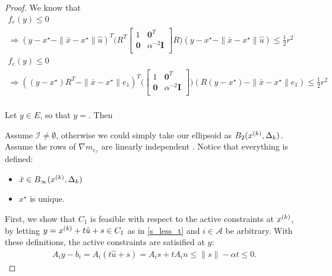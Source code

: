 \begin{proof}
\vspace{10cm}








We know that
\begin{align*}
f_e(y) \le 0 \\
\Longrightarrow (y - x^{\star} - \|\bar x - x^{\star} \|\hat u)^T\bigg(R^T\begin{bmatrix}
1 & \boldsymbol0^T \\
\boldsymbol 0 & \alpha^{-2} \boldsymbol I \\
\end{bmatrix}R\bigg)(y - x^{\star} - \|\bar x - x^{\star} \|\hat u) \le \frac 1 2 r^2 \\
f_e(y) \le 0 \\
\Longrightarrow ((y - x^{\star})R^T - \|\bar x - x^{\star} \|e_1)^T\bigg(\begin{bmatrix}
1 & \boldsymbol0^T \\
\boldsymbol 0 & \alpha^{-2} \boldsymbol I \\
\end{bmatrix}\bigg)(R(y - x^{\star}) - \|\bar x - x^{\star} \|e_1) \le \frac 1 2 r^2 \\
\end{align*}

Let $y \in E$, so that $y = $.
Then



Assume $\mathcal I \ne \emptyset $, otherwise we could simply take our ellipsoid as $B_2({x^{(k)}}, \Delta_k)$.
\color{red} Assume the rows of $\nabla m_{c_{\mathcal I}}$ are linearly independent \color{black}.
Notice that everything is defined:
\begin{itemize}
    \item $\bar x \in B_{\infty}({x^{(k)}}, \Delta_k)$
    \item $x^{\star}$ is unique.
\end{itemize}

First, we show that $C_1$ is feasible with respect to the active constraints at ${x^{(k)}}$,
by letting $y = {x^{(k)}} + t\hat u + s\in C_1$ as in \ref{s_less_t} and $i \in \mathcal A$ be arbitrary.
With these definitions, the active constraints are satisified at $y$:
\begin{align*}
A_{i}y - b_{i} = A_{i}(t\hat u + s) = A_{i}s + t A_{i}n \le \|s\| - \alpha t \le 0.
\end{align*}


\end{proof}
